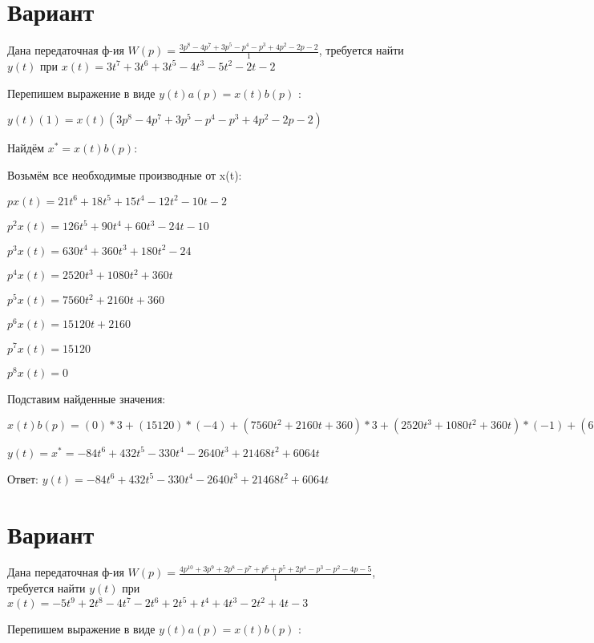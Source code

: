 \documentclass{article}
\begin{document}
{\section{Вариант}

Дана передаточная ф-ия $W(p)=\frac{3p^{8}-4p^{7}+3p^{5}-p^{4}-p^{3}+4p^{2}-2p-2}{1}$, требуется найти $y(t)$ при $x(t)=3t^{7}+3t^{6}+3t^{5}-4t^{3}-5t^{2}-2t-2$

Перепишем выражение в виде $y(t)a(p)=x(t)b(p)$ :

$y(t)(1)=x(t)(3p^{8}-4p^{7}+3p^{5}-p^{4}-p^{3}+4p^{2}-2p-2)$

Найдём $x^*=x(t)b(p)$:

Возьмём все необходимые производные от x(t):

$px(t)=21t^{6}+18t^{5}+15t^{4}-12t^{2}-10t-2$

$p^2x(t)=126t^{5}+90t^{4}+60t^{3}-24t-10$

$p^3x(t)=630t^{4}+360t^{3}+180t^{2}-24$

$p^4x(t)=2520t^{3}+1080t^{2}+360t$

$p^5x(t)=7560t^{2}+2160t+360$

$p^6x(t)=15120t+2160$

$p^7x(t)=15120$

$p^8x(t)=0$

Подставим найденные значения:

$x(t)b(p) = (0)*3+(15120)*(-4)+(7560t^{2}+2160t+360)*3+(2520t^{3}+1080t^{2}+360t)*(-1)+(630t^{4}+360t^{3}+180t^{2}-24)*(-1)+(126t^{5}+90t^{4}+60t^{3}-24t-10)*4+(21t^{6}+18t^{5}+15t^{4}-12t^{2}-10t-2)*(-2)+(21t^{6}+18t^{5}+15t^{4}-12t^{2}-10t-2)*(-2)=-84t^{6}+432t^{5}-330t^{4}-2640t^{3}+21468t^{2}+6064t$





$y(t)=x^*=-84t^{6}+432t^{5}-330t^{4}-2640t^{3}+21468t^{2}+6064t$

Ответ: $y(t) = -84t^{6}+432t^{5}-330t^{4}-2640t^{3}+21468t^{2}+6064t$

\section{Вариант}

Дана передаточная ф-ия $W(p)=\frac{4p^{10}+3p^{9}+2p^{8}-p^{7}+p^{6}+p^{5}+2p^{4}-p^{3}-p^{2}-4p-5}{1}$, требуется найти $y(t)$ при $x(t)=-5t^{9}+2t^{8}-4t^{7}-2t^{6}+2t^{5}+t^{4}+4t^{3}-2t^{2}+4t-3$

Перепишем выражение в виде $y(t)a(p)=x(t)b(p)$ :

}
\end{document}
